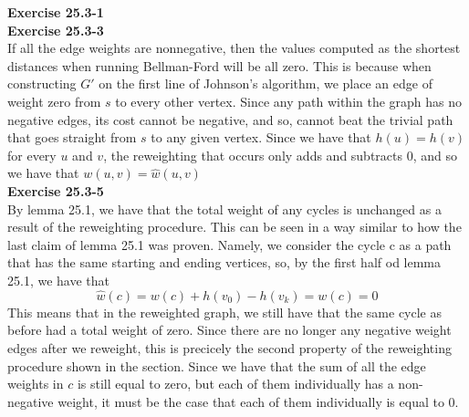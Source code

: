 \documentclass{article}
\begin{document}
\noindent\textbf{Exercise 25.3-1}\\



\noindent\textbf{Exercise 25.3-3}\\
If all the edge weights are nonnegative, then the values computed as the shortest distances when running Bellman-Ford will be all zero. This is because when constructing $G'$ on the first line of Johnson's algorithm, we place an edge of weight zero from $s$ to every other vertex. Since any path within the graph has no negative edges, its cost cannot be negative, and so, cannot beat the trivial path that goes straight from $s$ to any given vertex. Since we have that $h(u) = h(v)$ for every $u$ and $v$, the reweighting that occurs only adds and subtracts 0, and so we have that $w(u,v) = \hat w(u,v)$\\


\noindent\textbf{Exercise 25.3-5}\\
By lemma 25.1, we have that the total weight of any cycles is unchanged as a result of the reweighting procedure. This can be seen in a way similar to how the last claim of lemma 25.1 was proven. Namely, we consider the cycle c as a path that has the same starting and ending vertices, so, by the first half od lemma 25.1, we have that
\[
\hat w(c) = w(c) + h(v_0) -h(v_k) = w(c) = 0
 \]
This means that in the reweighted graph, we still have that the same cycle as before had a total weight of zero. Since there are no longer any negative weight edges after we reweight, this is precicely the second property of the reweighting procedure shown in the section. Since we have that the sum of all the edge weights in $c$ is still equal to zero, but each of them individually has a non-negative weight, it must be the case that each of them individually is equal to 0.
\end{document}

